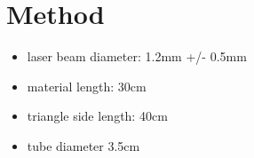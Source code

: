 \newpage
\section{Method} \label{sec:method}
\begin{itemize}
    \item laser beam diameter: 1.2mm +/- 0.5mm
    \item material length: 30cm
    \item triangle side length: 40cm
    \item tube diameter 3.5cm
\end{itemize}
